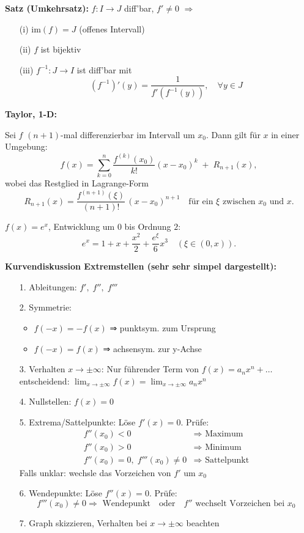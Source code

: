 \begin{itemize}
\textbf{Satz (Umkehrsatz):}  
\(f: I \to J\) diff'bar, \(f' \ne 0\)  
\(\Rightarrow\)
\begin{itemize}
  \item[(i)] \(\text{im}(f) = J\) (offenes Intervall)
  \item[(ii)] \(f\) ist bijektiv
  \item[(iii)] \(f^{-1}: J \to I\) ist diff'bar mit  
    \[
    (f^{-1})'(y) = \frac{1}{f'(f^{-1}(y))}, \quad \forall y \in J
    \]
\end{itemize}

\textbf{Taylor, 1-D:}
\begin{theorem}
  Sei $f$ $(n+1)$-mal differenzierbar im Intervall um $x_0$. Dann gilt für $x$ in einer Umgebung:
  \[
    f(x) = \sum_{k=0}^n \frac{f^{(k)}(x_0)}{k!}(x - x_0)^k 
    \;+\; R_{n+1}(x),
  \]
  wobei das Restglied in Lagrange-Form
  \[
    R_{n+1}(x) = \frac{f^{(n+1)}(\xi)}{(n+1)!}\,(x - x_0)^{n+1}
    \quad\text{für ein }\xi\text{ zwischen }x_0\text{ und }x.
  \]
\end{theorem}
\begin{example}
  $f(x) = e^x$, Entwicklung um $0$ bis Ordnung $2$:
  \[
    e^x = 1 + x + \frac{x^2}{2} + \frac{e^\xi}{6} x^3 \quad(\xi\in(0,x)).
  \]
\end{example}

\textbf{Kurvendiskussion Extremstellen (sehr sehr simpel dargestellt):}
\begin{itemize}
  \item[1.] Ableitungen: \( f',\; f'',\; f''' \)
  \item[2.] Symmetrie:
    \begin{itemize}
      \item \( f(-x) = -f(x) \) ⇒ punktsym. zum Ursprung
      \item \( f(-x) = f(x) \) ⇒ achsensym. zur y-Achse
    \end{itemize}
  \item[3.] Verhalten \( x \to \pm\infty \):  
    Nur führender Term von \( f(x) = a_n x^n + \ldots \) entscheidend:  
    \( \lim_{x \to \pm\infty} f(x) = \lim_{x \to \pm\infty} a_n x^n \)
  \item[4.] Nullstellen: \( f(x) = 0 \)
  \item[5.] Extrema/Sattelpunkte: Löse \( f'(x) = 0 \). Prüfe:
    \[
    \begin{aligned}
      f''(x_0) < 0 &\Rightarrow \text{ Maximum} \\
      f''(x_0) > 0 &\Rightarrow \text{ Minimum} \\
      f''(x_0) = 0,\; f'''(x_0) \neq 0 &\Rightarrow \text{ Sattelpunkt}
    \end{aligned}
    \]
    Falls unklar: wechsle das Vorzeichen von \( f' \) um \( x_0 \)
  \item[6.] Wendepunkte: Löse \( f''(x) = 0 \). Prüfe:
    \[
    f'''(x_0) \neq 0 \Rightarrow \text{ Wendepunkt}
    \quad \text{oder} \quad
    f'' \text{ wechselt Vorzeichen bei } x_0
    \]
  \item[7.] Graph skizzieren, Verhalten bei \( x \to \pm\infty \) beachten
\end{itemize}



\end{itemize}
